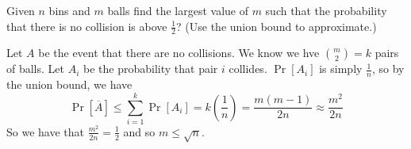 \question 
Given $n$ bins and $m$ balls find the largest value of $m$ such that the probability that there is no collision is above $\frac{1}{2}$? (Use the union bound to approximate.)
    \begin{solution}[1.5 in] Let $A$ be the event that there are no collisions. We know we hve $\binom{m}{2} = k$ pairs of balls. Let $A_i$ be the probability that pair $i$ collides. $\Pr[A_i]$ is simply $\frac{1}{n}$, so by the union bound, we have 
    \[\Pr[\overline{A}] \leq \sum_{i=1}^{k} \Pr[A_i] = k \left(\frac{1}{n}\right) = \frac{m(m-1)}{2n}\approx \frac{m^2}{2n}\]
    So we have that $\frac{m^2}{2n} = \frac{1}{2}$ and so $m \leq \sqrt{n}$. 
\end{solution} 
